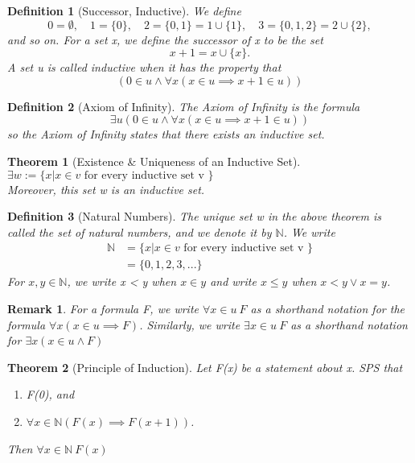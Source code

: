 \documentclass[11pt, oneside]{book}
\theoremstyle{break}
\newtheorem{thm}{Theorem}[section]
\newtheorem*{remark}{Remark}
\newtheorem{defn}{Definition}[section]
\newcommand{\bb}[1]{\mathbb{#1}}		%
\begin{document}
\begin{defn}[Successor, Inductive]
	We define
	\[
		0 = \emptyset, \quad	1 = \{0\}, \quad	2 = \{0, 1\} = 1 \cup \{1\}, \quad	3 = \{0, 1, 2\} = 2 \cup \{2\},
	\] and so on. For a set x, we define the successor of x to be the set
	\[
		x + 1 = x \cup \{x\}.
	\] A set u is called inductive when it has the property that
	\[
		(0 \in u \land \forall x (x \in u \implies x + 1 \in u))
	\]
\end{defn}

\begin{defn}[Axiom of Infinity]
	The Axiom of Infinity is the formula
	\[
		\exists u (0 \in u \land \forall x (x \in u \implies x + 1 \in u))
	\] so the Axiom of Infinity states that there exists an inductive set.
\end{defn}

\begin{thm}[Existence \& Uniqueness of an Inductive Set]
	$\exists w := \{x | x \in v \text{ for every inductive set v }\}$ \\
	Moreover, this set w is an inductive set.
\end{thm}

\begin{defn}[Natural Numbers]
	The unique set w in the above theorem is called the set of natural numbers, and we denote it by $\bb{N}$. We write
	\begin{align*}
		\bb{N} &= \{x | x \in v \text{ for every inductive set v }\} \\
			   &= \{0, 1, 2, 3, ...\}
	\end{align*}
	For $x, y \in \bb{N}$, we write x < y when $x \in y$ and write $x \leq y$ when $x < y \lor x = y$.
\end{defn}

\begin{remark}
	For a formula F, we write $\forall x \in u \> F$ as a shorthand notation for the formula $\forall x (x \in u \implies F)$. Similarly, we write $\exists x \in u \> F$ as a shorthand notation for $\exists x (x \in u \land F)$
\end{remark}

\begin{thm}[Principle of Induction]
	Let F(x) be a statement about x. SPS that
	\begin{enumerate}
		\item F(0), and
		\item $\forall x \in \bb{N} (F(x) \implies F(x+1))$.
	\end{enumerate}
	Then $\forall x \in \bb{N} \> F(x)$
\end{thm}
\end{document}
